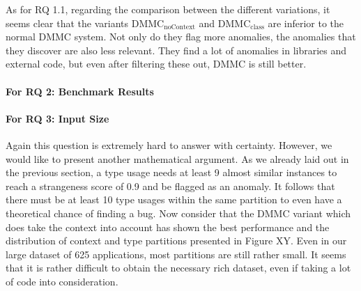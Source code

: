 As for RQ 1.1, regarding the comparison between the different variations, it seems clear that the variants $\text{DMMC}_\text{noContext}$ and $\text{DMMC}_\text{class}$ are inferior to the normal $\text{DMMC}$ system.
Not only do they flag more anomalies, the anomalies that they discover are also less relevant.
They find a lot of anomalies in libraries and external code, but even after filtering these out, $\text{DMMC}$ is still better.


\paragraph{For RQ 2: Benchmark Results}


\paragraph{For RQ 3: Input Size}

Again this question is extremely hard to answer with certainty.
However, we would like to present another mathematical argument. 
As we already laid out in the previous section, a type usage needs at least 9 almost similar instances to reach a strangeness score of 0.9 and be flagged as an anomaly.
It follows that there must be at least 10 type usages within the same partition to even have a theoretical chance of finding a bug.
Now consider that the $\text{DMMC}$ variant which does take the context into account has shown the best performance and the distribution of context and type partitions presented in Figure XY.
Even in our large dataset of 625 applications, most partitions are still rather small. 
It seems that it is rather difficult to obtain the necessary rich dataset, even if taking a lot of code into consideration.

